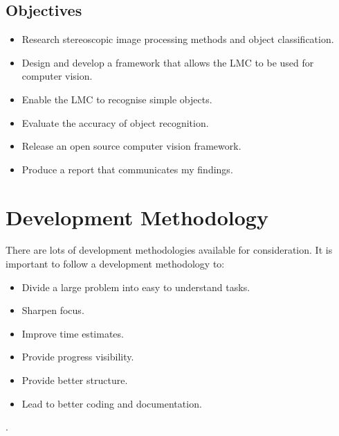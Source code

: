 \documentclass[11pt,oneside]{report}
\begin{document}
		\subsection{Objectives} 
		\begin{itemize}
			\item Research stereoscopic image processing methods and object classification.
			\item Design and develop a framework that allows the LMC to be used for computer vision.
			\item Enable the LMC to recognise simple objects.
			\item Evaluate the accuracy of object recognition.
			\item Release an open source computer vision framework.
			\item Produce a report that communicates my findings.
		\end{itemize}
			
		\section{Development Methodology}
					There are lots of development methodologies available for consideration.
					It is important to follow a development methodology to:
					\begin{itemize}
						\item Divide a large problem into easy to understand tasks.
						\item Sharpen focus.
						\item Improve time estimates.
						\item Provide progress visibility.
						\item Provide better structure.
						\item Lead to better coding and documentation.
					\end{itemize}\cite{book:dawson}.
					
\end{document}

